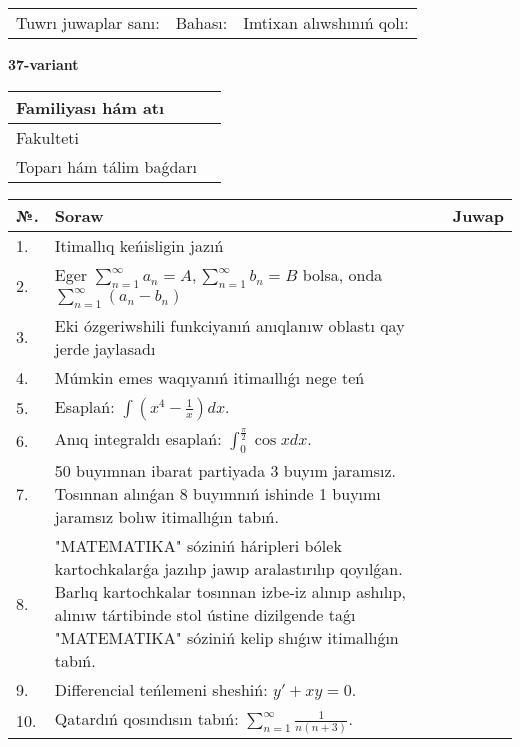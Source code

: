 \documentclass{article}
\begin{document}
\vspace{1cm}

\begin{tabular}{ c c c }
Tuwrı juwaplar sanı: \underline{\hspace{2cm}} & Bahası: \underline{\hspace{2cm}} & Imtixan alıwshınıń qolı: \underline{\hspace{2cm}} \\
\end{tabular}

\newpage

\begin{center}\textbf{37-variant}\end{center}

\bgroup
\def\arraystretch{1.5}
\begin{tabular}{ |m{6cm}|m{10cm}| }
  \hline
  Familiyası hám atı & \\
  \hline
  Fakulteti &\\
  \hline
  Toparı hám tálim baǵdarı & \\
  \hline
\end{tabular}
\egroup

\vspace{0.5cm}

\bgroup
\def\arraystretch{2}
\begin{tabular}{ |l|m{8cm}|m{7cm}| }
  \hline
  №. & Soraw & Juwap \\
  \hline
  1. & Itimallıq keńisligin jazıń &  \\
  \hline
  2. & Eger $\displaystyle\sum_{n = 1}^{\infty}a_{n} = A, \sum_{n = 1}^{\infty}b_{n} = B$ bolsa, onda $\displaystyle\sum_{n = 1}^{\infty}\left( a_{n} - b_{n} \right)$ &  \\
  \hline
  3. & Eki ózgeriwshili funkciyanıń anıqlanıw oblastı qay jerde jaylasadı &  \\
  \hline
  4. & Múmkin emes waqıyanıń itimaıllıǵı nege teń &  \\
  \hline
  5. & Esaplań: $\displaystyle\int \left( x^{4}-\frac{1}{x} \right)dx$. &  \\
  \hline
  6. & Anıq integraldı esaplań: $\displaystyle\int_{0}^{\frac{\pi}{2}}\cos xdx$. &  \\
  \hline
  7. & 50 buyımnan ibarat partiyada 3 buyım jaramsız. Tosınnan alınǵan 8 buyımnıń ishinde 1 buyımı jaramsız bolıw itimallıǵın tabıń. &  \\
  \hline
  8. & "MATEMATIKA" sóziniń háripleri bólek kartochkalarǵa jazılıp jawıp aralastırılıp qoyılǵan. Barlıq kartochkalar tosınnan izbe-iz alınıp ashılıp, alınıw tártibinde stol ústine dizilgende taǵı "MATEMATIKA" sóziniń kelip shıǵıw itimallıǵın tabıń. &  \\
  \hline
  9. & Differencial teńlemeni sheshiń: $y' + xy = 0$. &  \\
  \hline
  10. & Qatardıń qosındısın tabıń: $\displaystyle\sum_{n = 1}^{\infty}\frac{1}{n(n + 3)}$. &  \\
  \hline
\end{tabular}
\egroup
\end{document}
